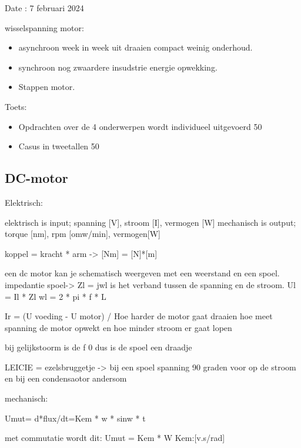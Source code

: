Date : 7 februari 2024

wisselspanning motor:
\begin{itemize}
    \item asynchroon week in week uit draaien compact weinig onderhoud.
    \item synchroon nog zwaardere insudstrie energie opwekking.
    \item Stappen motor.
\end{itemize}

Toets:
\begin{itemize}
    \item Opdrachten over de 4 onderwerpen wordt individueel uitgevoerd 50%
    \item Casus in tweetallen 50%
\end{itemize}

\subsection{DC-motor}

Elektrisch:

elektrisch is input; spanning [V], stroom [I], vermogen [W]
mechanisch is output; torque [nm], rpm [omw/min], vermogen[W]

koppel = kracht * arm -> [Nm] = [N]*[m]

een dc motor kan je schematisch weergeven met een weerstand en een spoel.
impedantie spoel-> Zl = jwl is het verband tussen de spanning en de stroom.
Ul = Il * Zl
wl = 2 * pi * f * L

Ir = (U voeding - U motor) / 
Hoe harder de motor gaat draaien hoe meet spanning de motor opwekt en hoe minder stroom er gaat lopen

bij gelijkstoorm is de f 0 dus is de spoel een draadje

LEICIE = ezelsbruggetje -> bij een spoel spanning 90 graden voor op de stroom en bij een condensaotor andersom

mechanisch:

Umut= d*flux/dt=Kem * w * sinw * t

met commutatie wordt dit: Umut = Kem * W
Kem:[v.s/rad]
